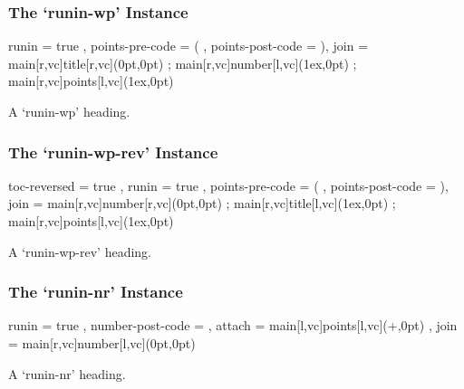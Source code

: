 \documentclass[DIV10,toc=index,toc=bib,numbers=noendperiod]{cnpkgdoc}
\begin{document}
\subsubsection{The `runin-wp' Instance}
\begin{beispiel}
  {
    runin            = true ,
    points-pre-code  = ( ,
    points-post-code = )\space ,
    join             =
      {
        main[r,vc]title[r,vc](0pt,0pt) ;
        main[r,vc]number[l,vc](1ex,0pt) ;
        main[r,vc]points[l,vc](1ex,0pt)
      }
  }
\end{beispiel}
\begin{question}{1}
 A `runin-wp' heading. \sample
\end{question}

\subsubsection{The `runin-wp-rev' Instance}
\begin{beispiel}
  {
    toc-reversed     = true ,
    runin            = true ,
    points-pre-code  = ( ,
    points-post-code = )\space ,
    join             =
      {
        main[r,vc]number[r,vc](0pt,0pt) ;
        main[r,vc]title[l,vc](1ex,0pt) ;
        main[r,vc]points[l,vc](1ex,0pt)
      }
  }
\end{beispiel}
\begin{question}{1}
 A `runin-wp-rev' heading. \sample
\end{question}

\subsubsection{The `runin-nr' Instance}
\begin{beispiel}
  {
    runin            = true ,
    number-post-code = \space ,
    attach           =
      { main[l,vc]points[l,vc](\linewidth+\marginparsep,0pt) } ,
    join             = { main[r,vc]number[l,vc](0pt,0pt) }
  }
\end{beispiel}
\begin{question}{1}
 A `runin-nr' heading. \sample
\end{question}

\newpage
\end{document}
